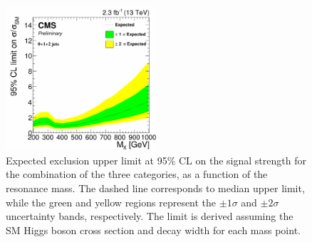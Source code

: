 \begin{figure}[!htb]
\centering
\includegraphics[width=0.5\textwidth]{images/13TeV/HighMass/exp_limit_012jet_mu.pdf}
\caption{Expected exclusion upper limit at 95\% CL on the signal strength for the combination of the three categories, as a function of the resonance mass. The dashed line corresponds to median upper limit, while the green and yellow regions represent the $\pm 1\sigma$ and $\pm 2 \sigma$ uncertainty bands, respectively. The limit is derived assuming the SM Higgs boson cross section and decay width for each mass point.}\label{fig:13TeVcombexplim}
\end{figure}



